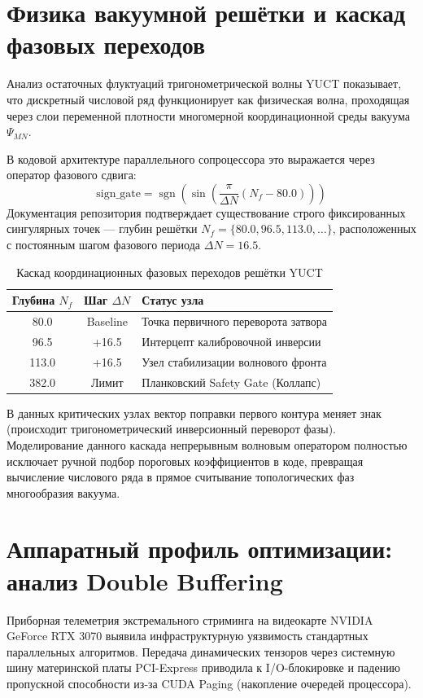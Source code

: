 \documentclass[11pt,a4paper]{article}
\begin{document}
	\section{Физика вакуумной решётки и каскад фазовых переходов}
	Анализ остаточных флуктуаций тригонометрической волны YUCT показывает, что дискретный числовой ряд функционирует как физическая волна, проходящая через слои переменной плотности многомерной координационной среды вакуума $\Psi_{MN}$.
	
	В кодовой архитектуре параллельного сопроцессора это выражается через оператор фазового сдвига:
	\begin{equation}
		\mathrm{sign\_gate} = \operatorname{sgn}\!\left(\sin\!\left(\frac{\pi}{\Delta N} (N_f - 80.0)\right)\right)
	\end{equation}
	Документация репозитория подтверждает существование строго фиксированных сингулярных точек — глубин решётки $N_f = \{80.0, 96.5, 113.0, \dots\}$, расположенных с постоянным шагом фазового периода $\Delta N = 16.5$.
	
	\begin{table}[h!]
		\centering
		\caption{Каскад координационных фазовых переходов решётки YUCT}
		\label{tab:phase_transitions}
		\small
		\begin{tabular}{ccl}
			\toprule
			\textbf{Глубина $N_f$} & \textbf{Шаг $\Delta N$} & \textbf{Статус узла} \\
			\midrule
			80.0  & Baseline & Точка первичного переворота затвора \\
			96.5  & +16.5 & Интерцепт калибровочной инверсии \\
			113.0 & +16.5 & Узел стабилизации волнового фронта \\
			382.0 & Лимит  & Планковский Safety Gate (Коллапс) \\
			\bottomrule
		\end{tabular}
	\end{table}
	
	В данных критических узлах вектор поправки первого контура меняет знак (происходит тригонометрический инверсионный переворот фазы). Моделирование данного каскада непрерывным волновым оператором полностью исключает ручной подбор пороговых коэффициентов в коде, превращая вычисление числового ряда в прямое считывание топологических фаз многообразия вакуума.
	
	\section{Аппаратный профиль оптимизации: анализ Double Buffering}
	Приборная телеметрия экстремального стриминга на видеокарте NVIDIA GeForce RTX 3070 выявила инфраструктурную уязвимость стандартных параллельных алгоритмов. Передача динамических тензоров через системную шину материнской платы PCI-Express приводила к I/O-блокировке и падению пропускной способности из-за CUDA Paging (накопление очередей процессора).
	
\end{document}
